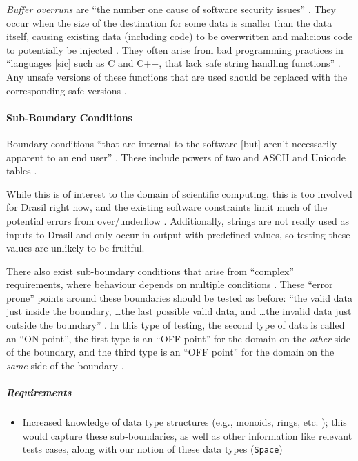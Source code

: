 \emph{Buffer overruns} are ``the number one cause of software security issues''
\cite[p.~75]{patton_software_2006}. They occur when the size of the destination
for some data is smaller than the data itself, causing existing data (including
code) to be overwritten and malicious code to potentially be injected
\cite[p.~202, 204-205]{patton_software_2006}. They often arise from bad
programming practices in ``languages [sic] such as C and C++, that lack safe
string handling functions'' \cite[p.~201]{patton_software_2006}. Any unsafe
versions of these functions that are used should be replaced with the
corresponding safe versions \cite[p.~203-204]{patton_software_2006}.

\paragraph{Sub-Boundary Conditions \cite[p.~75-77]{patton_software_2006}}
\label{sub-bound-conds}

Boundary conditions ``that are internal to the software [but] aren't necessarily
apparent to an end user'' \cite[p.~75]{patton_software_2006}. These include
powers of two \cite[p.~75-76]{patton_software_2006} and ASCII and Unicode tables
\cite[p.~76-77]{patton_software_2006}.

While this is of interest to the domain of scientific computing, this is too
involved for Drasil right now, and the existing software constraints limit much
of the potential errors from over/underflow \cite{june_11_meeting}. Additionally,
strings are not really used as inputs to Drasil and only occur in output with
predefined values, so testing these values are unlikely to be fruitful.

There also exist sub-boundary conditions that arise from ``complex''
requirements, where behaviour depends on multiple conditions
\cite[p.~430]{van_vliet_software_2000}. These ``error prone'' points around
these boundaries should be tested \cite[p.~430]{van_vliet_software_2000} as
before: ``the valid data just inside the boundary, \dots the last possible
valid data, and \dots the invalid data just outside the boundary''
\cite[p.~73]{patton_software_2006}. In this type of testing, the second type of
data is called an ``ON point'', the first type is an ``OFF point'' for the
domain on the \emph{other} side of the boundary, and the third type is an ``OFF
point'' for the domain on the \emph{same} side of the boundary
\cite[p.~430]{van_vliet_software_2000}.

\subparagraph{Requirements}
\begin{itemize}
      \item Increased knowledge of data type structures (e.g., monoids, rings,
            etc. \cite{june_11_meeting}); this would capture these sub-boundaries,
            as well as other information like relevant tests cases, along with
            our notion of these data types (\texttt{Space})
\end{itemize}

